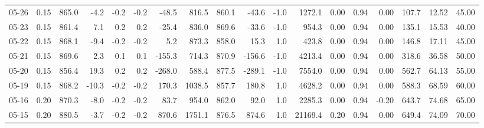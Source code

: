 \begin{threeparttable}
{\begin{tabular}{lrrrrrrrrrrrrrrrrr}
  05-26 &     0.15 & 865.0 &              -4.2 &              -0.2 &               -0.2 &              -48.5 &  816.5 & 860.1 &      -43.6 &                     -1.0 &              1272.1 &       0.00 &      0.94 &           0.00 &            107.7 &           12.52 &                  45.00 \\
  05-23 &     0.15 & 861.4 &               7.1 &               0.2 &                0.2 &              -25.4 &  836.0 & 869.6 &      -33.6 &                     -1.0 &               954.3 &       0.00 &      0.94 &           0.00 &            135.1 &           15.53 &                  40.00 \\
  05-22 &     0.15 & 868.1 &              -9.4 &              -0.2 &               -0.2 &                5.2 &  873.3 & 858.0 &       15.3 &                      1.0 &               423.8 &       0.00 &      0.94 &           0.00 &            146.8 &           17.11 &                  45.00 \\
  05-21 &     0.15 & 869.6 &               2.3 &               0.1 &                0.1 &             -155.3 &  714.3 & 870.9 &     -156.6 &                     -1.0 &              4213.4 &       0.00 &      0.94 &           0.00 &            318.6 &           36.58 &                  50.00 \\
  05-20 &     0.15 & 856.4 &              19.3 &               0.2 &                0.2 &             -268.0 &  588.4 & 877.5 &     -289.1 &                     -1.0 &              7554.0 &       0.00 &      0.94 &           0.00 &            562.7 &           64.13 &                  55.00 \\
  05-19 &     0.15 & 868.2 &             -10.3 &              -0.2 &               -0.2 &              170.3 & 1038.5 & 857.7 &      180.8 &                      1.0 &              4628.2 &       0.00 &      0.94 &           0.00 &            588.3 &           68.59 &                  60.00 \\
  05-16 &     0.20 & 870.3 &              -8.0 &              -0.2 &               -0.2 &               83.7 &  954.0 & 862.0 &       92.0 &                      1.0 &              2285.3 &       0.00 &      0.94 &          -0.20 &            643.7 &           74.68 &                  65.00 \\
  05-15 &     0.20 & 880.5 &              -3.7 &              -0.2 &               -0.2 &              870.6 & 1751.1 & 876.5 &      874.6 &                      1.0 &             21169.4 &       0.20 &      0.94 &           0.00 &            649.4 &           74.09 &                  70.00 \\

\end{tabular}}
\end{threeparttable}
